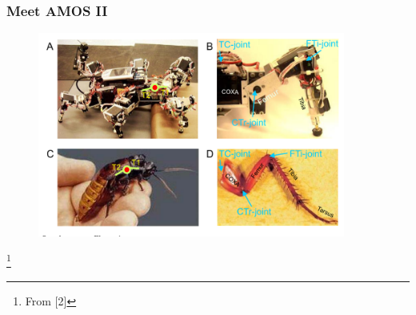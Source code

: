 \documentclass{beamer}
\begin{document}
\begin{frame}
\frametitle{Meet AMOS II}
\begin{figure}
\center
\includegraphics[width=0.9\textwidth]{figs/AMOSII-cockroach.pdf}
\end{figure}
\footnote{From [2]}
\end{frame}
\end{document}
